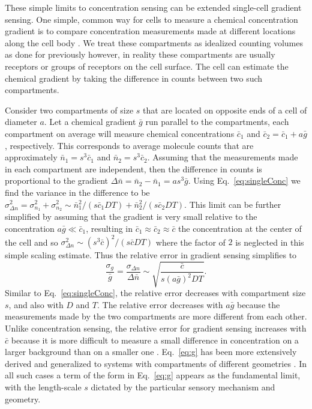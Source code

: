 \documentclass[a4paper]{article}
\begin{document}
These simple limits to concentration sensing can be extended single-cell gradient sensing. One simple, common way for cells to measure a chemical concentration gradient is to compare concentration measurements made at different locations along the cell body \cite{jilkine2011comparison}. We treat these compartments as idealized counting volumes as done for previously however, in reality these compartments are usually receptors or groups of receptors on the cell surface. The cell can estimate the chemical gradient by taking the difference in counts between two such compartments.

Consider two compartments of size $s$ that are located on opposite ends of a cell of diameter $a$. Let a chemical gradient $\bar{g}$ run parallel to the compartments, each compartment on average will measure chemical concentrations
$\bar{c}_1$ and $\bar{c}_2=\bar{c}_1+a\bar{g}$, respectively.
This corresponds to average molecule counts that are approximately
$\bar{n}_1=s^3\bar{c}_1$ and $\bar{n}_2=s^3\bar{c}_2$.
Assuming that the measurements made in each compartment are independent, then the difference in counts is proportional to the gradient
$\Delta\bar{n} = \bar{n}_2 - \bar{n}_1 = as^3\bar{g}$.
Using Eq.\ \ref{eq:singleConc} we find the variance in the difference to be
$\sigma_{\Delta n}^2 = \sigma_{n_1}^2 + \sigma_{n_2}^2 \sim \bar{n}_1^2/(s\bar{c}_1DT) + \bar{n}_2^2/(s\bar{c}_2DT)$.
This limit can be further simplified by assuming that the gradient is very small relative to the concentration $a\bar{g}\ll\bar{c}_1$, resulting in $\bar{c}_1\approx\bar{c}_2\approx\bar{c}$ the concentration at the center of the cell and so
$\sigma_{\Delta n}^2 \sim (s^3\bar{c})^2/(s\bar{c}DT)$
where the factor of $2$ is neglected in this simple scaling estimate. Thus the relative error in gradient sensing simplifies to
\begin{equation} \label{eq:g}
\frac{\sigma_g}{\bar{g}} = \frac{\sigma_{\Delta n}}{\Delta \bar{n}} \sim \sqrt{\frac{\bar{c}}{s(a\bar{g})^2DT}}.
\end{equation}
Similar to Eq.\ \ref{eq:singleConc}, the relative error decreases with compartment size $s$, and also with $D$ and $T$. The relative error decreases with $a\bar{g}$ because the measurements made by the two compartments are more different from each other. Unlike concentration sensing, the relative error for gradient sensing increases with $\bar{c}$ because it is more difficult to measure a small difference in concentration on a larger background than on a smaller one \cite{ellison2015cell}. Eq.\ \ref{eq:g} has been more extensively derived and generalized to systems with compartments of different geometries \cite{endres2008accuracy,endres2009accuracy,hu2010physical}. In all such cases a term of the form in Eq.\ \ref{eq:g} appears as the fundamental limit, with the length-scale $s$ dictated by the particular sensory mechanism and geometry.
\end{document}
